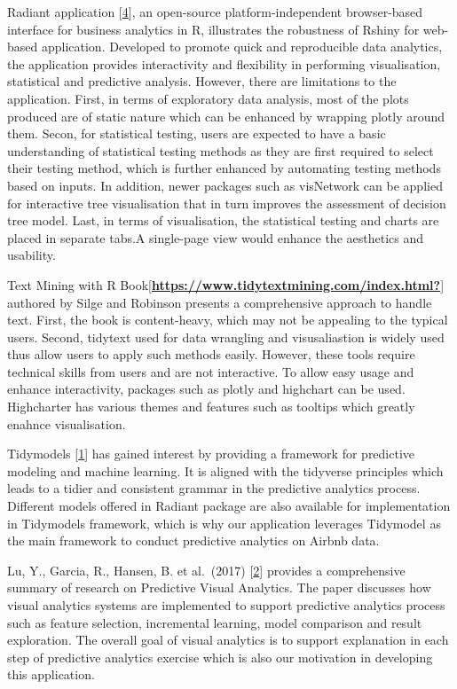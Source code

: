 \documentclass{acm_proc_article-sp}
\begin{document}
Radiant application {[}\protect\hyperlink{ref-radiant2019}{4}{]}, an
open-source platform-independent browser-based interface for business
analytics in R, illustrates the robustness of Rshiny for web-based
application. Developed to promote quick and reproducible data analytics,
the application provides interactivity and flexibility in performing
visualisation, statistical and predictive analysis. However, there are
limitations to the application. First, in terms of exploratory data
analysis, most of the plots produced are of static nature which can be
enhanced by wrapping plotly around them. Secon, for statistical testing,
users are expected to have a basic understanding of statistical testing
methods as they are first required to select their testing method, which
is further enhanced by automating testing methods based on inputs. In
addition, newer packages such as visNetwork can be applied for
interactive tree visualisation that in turn improves the assessment of
decision tree model. Last, in terms of visualisation, the statistical
testing and charts are placed in separate tabs.A single-page view would
enhance the aesthetics and usability.

Text Mining with R
Book{[}\protect\hyperlink{ref-https:ux2fux2fwww.tidytextmining.comux2findex.html}{\textbf{https://www.tidytextmining.com/index.html?}}{]}
authored by Silge and Robinson presents a comprehensive approach to
handle text. First, the book is content-heavy, which may not be
appealing to the typical users. Second, tidytext used for data wrangling
and visusaliastion is widely used thus allow users to apply such methods
easily. However, these tools require technical skills from users and are
not interactive. To allow easy usage and enhance interactivity, packages
such as plotly and highchart can be used. Highcharter has various themes
and features such as tooltips which greatly enahnce visualisation.

Tidymodels {[}\protect\hyperlink{ref-tidymodels2020}{1}{]} has gained
interest by providing a framework for predictive modeling and machine
learning. It is aligned with the tidyverse principles which leads to a
tidier and consistent grammar in the predictive analytics process.
Different models offered in Radiant package are also available for
implementation in Tidymodels framework, which is why our application
leverages Tidymodel as the main framework to conduct predictive
analytics on Airbnb data.

Lu, Y., Garcia, R., Hansen, B. et al.~(2017)
{[}\protect\hyperlink{ref-https:ux2fux2fdoi.orgux2f10.1111ux2fcgf.13210}{2}{]}
provides a comprehensive summary of research on Predictive Visual
Analytics. The paper discusses how visual analytics systems are
implemented to support predictive analytics process such as feature
selection, incremental learning, model comparison and result
exploration. The overall goal of visual analytics is to support
explanation in each step of predictive analytics exercise which is also
our motivation in developing this application.
\end{document}
